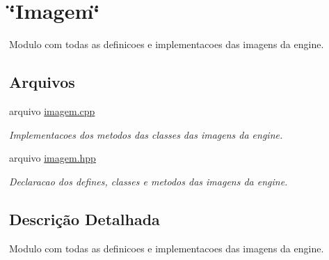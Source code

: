 \hypertarget{group__MOD__IMAGEM}{
\section{\char`\"{}Imagem\char`\"{}}
\label{group__MOD__IMAGEM}
}


Modulo com todas as definicoes e implementacoes das imagens da engine.  


\subsection*{Arquivos}
\begin{DoxyCompactItemize}
\item 
arquivo \hyperlink{imagem_8cpp}{imagem.cpp}


\begin{DoxyCompactList}\small\item\em Implementacoes dos metodos das classes das imagens da engine. \item\end{DoxyCompactList}

\item 
arquivo \hyperlink{imagem_8hpp}{imagem.hpp}


\begin{DoxyCompactList}\small\item\em Declaracao dos defines, classes e metodos das imagens da engine. \item\end{DoxyCompactList}

\end{DoxyCompactItemize}


\subsection{Descrição Detalhada}
Modulo com todas as definicoes e implementacoes das imagens da engine. 